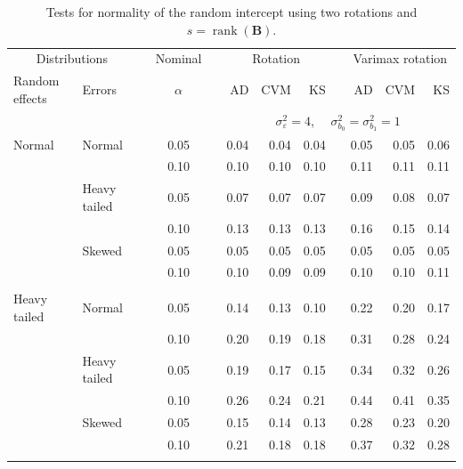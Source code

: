 \documentclass[12pt]{article} %
\DeclareMathOperator{\rank}{rank}
\begin{document}
\begin{table}[ht]
\caption{Tests for normality of the random intercept using two rotations and $s = \rank(\bm{B})$.}
\begin{scriptsize}
\begin{center}
\begin{tabular}{ll p{.1cm} c p{.1cm} rrr p{.1cm} rrr}
  \hline
  \multicolumn{2}{c}{Distributions}& & Nominal & &  \multicolumn{3}{c}{Rotation} & & \multicolumn{3}{c}{Varimax rotation} \\ \cline{1-2} \cline{6-8} \cline{10-12}   
  Random effects & Errors & & $\alpha$ & & AD & CVM & KS & & AD & CVM & KS \\ 
   \hline
& && && \multicolumn{7}{c}{$\sigma_{\varepsilon}^2 = 4$, \ \ $\sigma_{b_0}^2 = \sigma_{b_1}^2 = 1$} \\ \cline{6-12}
\rowcolor{gray!20}Normal       & Normal       && 0.05 &&   0.04 & 0.04 & 0.04 && 0.05 & 0.05 & 0.06 \\ 
\rowcolor{gray!20}             &              && 0.10 &&   0.10 & 0.10 & 0.10 && 0.11 & 0.11 & 0.11 \\ 
\rowcolor{gray!20}             & Heavy tailed && 0.05 &&   0.07 & 0.07 & 0.07 && 0.09 & 0.08 & 0.07 \\ 
\rowcolor{gray!20}             &              && 0.10 &&   0.13 & 0.13 & 0.13 && 0.16 & 0.15 & 0.14 \\ 
\rowcolor{gray!20}             & Skewed       && 0.05 &&   0.05 & 0.05 & 0.05 && 0.05 & 0.05 & 0.05 \\ 
\rowcolor{gray!20}             &              && 0.10 &&   0.10 & 0.09 & 0.09 && 0.10 & 0.10 & 0.11 \\ 
             &&&&&&&&&&&\\
Heavy tailed & Normal       && 0.05 &&   0.14 & 0.13 & 0.10 && 0.22 & 0.20 & 0.17 \\ 
             &              && 0.10 &&   0.20 & 0.19 & 0.18 && 0.31 & 0.28 & 0.24 \\ 
             & Heavy tailed && 0.05 &&   0.19 & 0.17 & 0.15 && 0.34 & 0.32 & 0.26 \\ 
             &              && 0.10 &&   0.26 & 0.24 & 0.21 && 0.44 & 0.41 & 0.35 \\ 
             & Skewed       && 0.05 &&   0.15 & 0.14 & 0.13 && 0.28 & 0.23 & 0.20 \\ 
             &              && 0.10 &&   0.21 & 0.18 & 0.18 && 0.37 & 0.32 & 0.28 \\ 
             &&&&&&&&&&&\\

\end{tabular}
\end{center}
\end{scriptsize}
\end{table}
\end{document}
